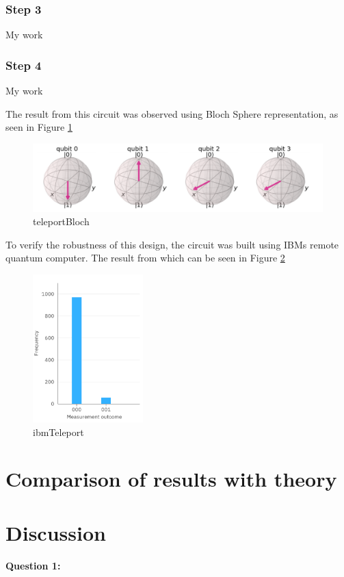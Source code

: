 \subsubsection{Step 3}
My work

\subsubsection{Step 4}
My work

The result from this circuit was observed using Bloch Sphere representation, as seen in Figure \ref{fig:teleportBloch}
\begin{figure}[h]
    \centering
    \includegraphics[width=\textwidth]{lab3/teleportBloch.png}
    \caption{teleportBloch}
    \label{fig:teleportBloch}
\end{figure}

To verify the robustness of this design, the circuit was built using IBMs remote quantum computer. The result from which can be seen in Figure \ref{fig:ibmTeleport}
\begin{figure}[h]
    \centering
    \includegraphics[width=0.38\textwidth]{lab3/ibmTeleport.png}
    \caption{ibmTeleport}
    \label{fig:ibmTeleport}
\end{figure}

\section{Comparison of results with theory}
\section{Discussion}
\textbf{Question 1:}

